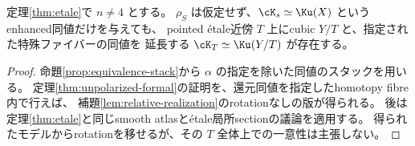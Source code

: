 \begin{corollary}[rotationを指定しない局所的存在]\label{cor:etale-unpolarized}
 定理\ref{thm:etale}で \(n\ne4\) とする。
 \(\rho_S\) は仮定せず、\(\cK_s\simeq\Ku(X)\) というenhanced同値だけを与えても、
 pointed étale近傍 \(T\) 上にcubic \(Y/T\) と、指定された特殊ファイバーの同値を
 延長する \(\cK_T\simeq\Ku(Y/T)\) が存在する。
\end{corollary}
\begin{proof}
 命題\ref{prop:equivalence-stack}から \(\alpha\) の指定を除いた同値のスタックを用いる。
 定理\ref{thm:unpolarized-formal}の証明を、還元同値を指定したhomotopy fibre内で行えば、
 補題\ref{lem:relative-realization}のrotationなしの版が得られる。
 後は定理\ref{thm:etale}と同じsmooth atlasとétale局所sectionの議論を適用する。
 得られたモデルからrotationを移せるが、その \(T\) 全体上での一意性は主張しない。
\end{proof}


